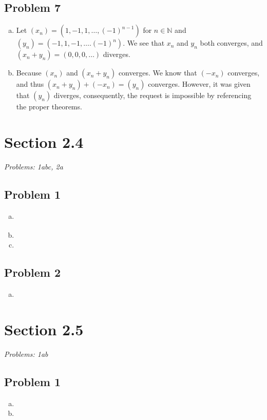 \documentclass[12pt]{article}
\begin{document}
\subsection*{Problem 7}
\begin{enumerate}[a).]
    \item {
    Let $(x_n) = (1, -1, 1, \dots, (-1)^{n-1})$ for $n \in \mathbb{N}$ and $(y_n) = (-1, 1, -1, \dots. (-1)^{n})$.
    We see that $x_n$ and $y_n$ both converges, and $(x_n + y_n) = (0,0,0,\dots)$ diverges. 
    }

    \item {
    Because $(x_n)$ and $(x_n + y_n)$ converges. 
    We know that $(-x_n)$ converges, and thus $(x_n + y_n) + (-x_n) = (y_n)$ converges.
    However, it was given that $(y_n)$ diverges, consequently, the request is impossible by referencing the proper theorems. 
    }
\end{enumerate}




\vspace*{1cm}

\section*{Section 2.4}
\textit{Problems: 1abc, 2a}
\subsection*{Problem 1}
\begin{enumerate}[a).]
    \item {
    }
    \item {

    }
    \item {

    }
\end{enumerate}
\subsection*{Problem 2}
\begin{enumerate}[a).]
    \item {

    }
\end{enumerate}

\vspace*{1cm}

\section*{Section 2.5}
\textit{Problems: 1ab}
\subsection*{Problem 1}
\begin{enumerate}[a).]
    \item {

    }
    \item {

    }
\end{enumerate}
\end{document}
